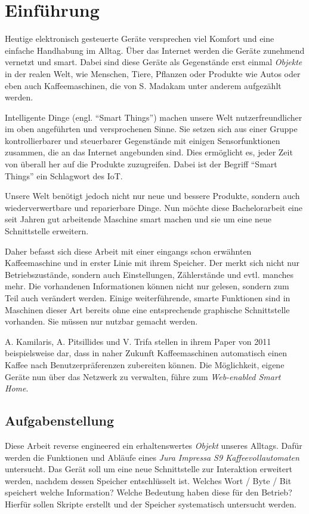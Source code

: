 \chapter{Einführung}
Heutige elektronisch gesteuerte Geräte versprechen viel Komfort und eine einfache Handhabung im Alltag.
Über das Internet werden die Geräte zunehmend vernetzt und smart.
Dabei sind diese Geräte als Gegenstände erst einmal \textit{Objekte} in der realen Welt, wie Menschen, Tiere, Pflanzen oder Produkte wie Autos oder eben auch Kaffeemaschinen, die von S. Madakam \cite{Madakam2015} unter anderem aufgezählt werden.

Intelligente Dinge (engl. "`Smart Things"') machen unsere Welt nutzerfreundlicher im oben angeführten und versprochenen Sinne.
Sie setzen sich aus einer Gruppe kontrollierbarer und steuerbarer Gegenstände mit einigen Sensorfunktionen zusammen, die an das Internet angebunden sind.
Dies ermöglicht es, jeder Zeit von überall her auf die Produkte zuzugreifen.
Dabei ist der Begriff "`Smart Things"' ein Schlagwort des \ac{IoT}. \cite{Madakam2015}

Unsere Welt benötigt jedoch nicht nur neue und bessere Produkte, sondern auch wiederverwertbare und reparierbare Dinge.
Nun möchte diese Bachelorarbeit eine seit Jahren gut arbeitende Maschine smart machen und sie um eine neue Schnittstelle erweitern.

Daher befasst sich diese Arbeit mit einer eingangs schon erwähnten Kaffeemaschine und in erster Linie mit ihrem Speicher.
Der merkt sich nicht nur Betriebszustände, sondern auch Einstellungen, Zählerstände und evtl. manches mehr.
Die vorhandenen Informationen können nicht nur gelesen, sondern zum Teil auch verändert werden.
Einige weiterführende, smarte Funktionen sind in Maschinen dieser Art bereits ohne eine entsprechende graphische Schnittstelle vorhanden.
Sie müssen nur nutzbar gemacht werden.

A. Kamilaris, A. Pitsillides und V. Trifa stellen in ihrem Paper von 2011 \cite{Kamilaris2011} beispielsweise dar, dass in naher Zukunft Kaffeemaschinen automatisch einen Kaffee nach Benutzerpräferenzen zubereiten können.
Die Möglichkeit, eigene Geräte nun über das Netzwerk zu verwalten, führe zum \textit{Web-enabled Smart Home}.

\section{Aufgabenstellung}
Diese Arbeit reverse engineered ein erhaltenswertes \textit{Objekt} unseres Alltags.
Dafür werden die Funktionen und Abläufe eines \textit{Jura Impressa S9 Kaffeevollautomaten} untersucht.
Das Gerät soll um eine neue Schnittstelle zur Interaktion erweitert werden, nachdem dessen Speicher entschlüsselt ist.
Welches Wort / Byte / Bit speichert welche Information? Welche Bedeutung haben diese für den Betrieb?
Hierfür sollen Skripte erstellt und der Speicher systematisch untersucht werden.

